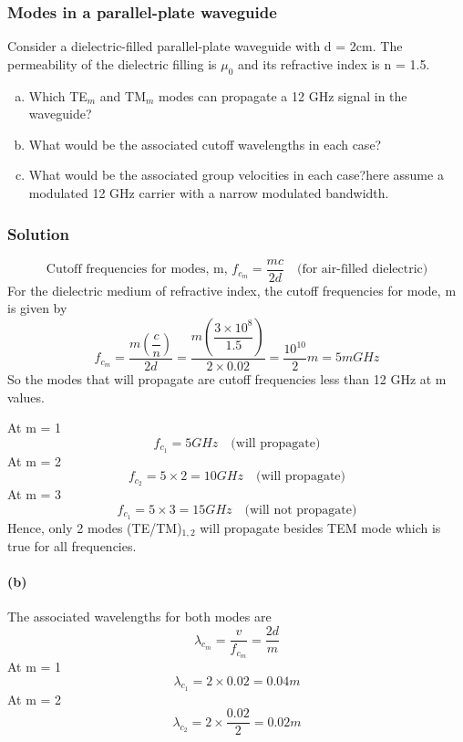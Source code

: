 \begin{exmp}
\subsubsection*{Modes in a parallel-plate waveguide}
Consider a dielectric-filled parallel-plate waveguide with d = 2cm. The permeability of the dielectric filling is $\mu_0$ and its refractive index is n = 1.5.
\begin{enumerate}[(a)]
\item Which TE$_m$ and TM$_m$ modes can propagate a 12 GHz signal in the waveguide?
\item What would be the associated cutoff wavelengths in each case?
\item What would be the associated group velocities in each case?\textemdash here assume a modulated 12 GHz carrier with a narrow modulated bandwidth.
\end{enumerate}

\subsubsection*{Solution}
\begin{dmath*}
\text{Cutoff frequencies for modes, m, }f_{c_m} = \frac{mc}{2d}\quad\text{(for air-filled dielectric)}
\end{dmath*}
For the dielectric medium of refractive index, the cutoff frequencies for mode, m is given by
\begin{dmath*}
f_{c_m} = \frac{m\left(\dfrac{c}{n}\right)}{2d} = \frac{m\left(\dfrac{3 \times 10^8}{1.5}\right)}{2\times 0.02} = \frac{10^{10}}{2}m = 5m GHz
\end{dmath*}
So the modes that will propagate are cutoff frequencies less than 12 GHz at m values.

At m = 1
\begin{dmath*}
f_{c_1} = 5 GHz\quad\text{(will propagate)}
\end{dmath*}
At m = 2
\begin{dmath*}
f_{c_2} = 5\times2 = 10 GHz\quad\text{(will propagate)}
\end{dmath*}
At m = 3
\begin{dmath*}
f_{c_1} = 5\times3 = 15 GHz\quad\text{(will not propagate)}
\end{dmath*}
Hence, only 2 modes (TE/TM)$_{1,2}$ will propagate besides TEM mode which is true for all frequencies.

\paragraph{(b)} The associated wavelengths for both modes are
\begin{dmath*}
\lambda_{c_m} = \frac{v}{f_{c_m}} = \frac{2d}{m}
\end{dmath*}
At m = 1
\begin{dmath*}
\lambda_{c_1} = 2\times0.02=0.04 m
\end{dmath*}
At m = 2
\begin{dmath*}
\lambda_{c_2} = 2\times\frac{0.02}{2} = 0.02 m
\end{dmath*}


\end{exmp}
